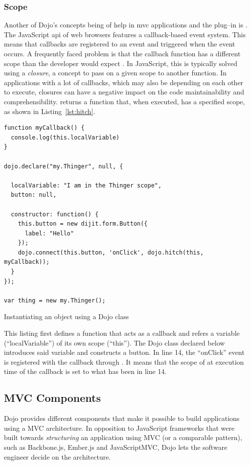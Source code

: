 \subsubsection{Scope}
Another of Dojo's concepts being of help in \ac{mvc} applications and the plug--in is . The JavaScript \ac{api} of web browsers features a callback-based event system. This means that callbacks are registered to an event and triggered when the event occurs. A frequently faced problem is that the \gls{callback} function has a different scope than the developer would expect \cite[pp. 53--56 and pp. 180--185]{flanagan}. In JavaScript, this is typically solved using a \emph{closure}, a concept to pass on a given scope to another function. In applications with a lot of callbacks, which may also be depending on each other to execute, closures can have a negative impact on the code maintainability and comprehensibility.  returns a function that, when executed, has a specified scope, as shown in Listing~\ref{lst:hitch}.

\begin{listing}[H]
\begin{verbatim}
function myCallback() {
  console.log(this.localVariable)
}

dojo.declare("my.Thinger", null, {

  localVariable: "I am in the Thinger scope",
  button: null,

  constructor: function() {
    this.button = new dijit.form.Button({
      label: "Hello"
    });
    dojo.connect(this.button, 'onClick', dojo.hitch(this, myCallback));
  }
});

var thing = new my.Thinger();
\end{verbatim}
\caption{Instantiating an object using a Dojo class}
\label{lst:hitch}
\end{listing}

This listing first defines a function that acts as a callback and refers a variable (``localVariable'') of its own scope (``this''). The Dojo class declared below introduces said variable and constructs a button. In line 14, the ``onClick'' event is registered with the callback through . It means that the scope of  at execution time of the callback is set to what  has been in line 14.
\subsection{MVC Components}
Dojo provides different components that make it possible to build applications using a MVC architecture. In opposition to JavaScript frameworks that were built towards \emph{structuring} an application using MVC (or a comparable pattern), such as Backbone.js, Ember.js and JavaScriptMVC, Dojo lets the software engineer decide on the architecture.

